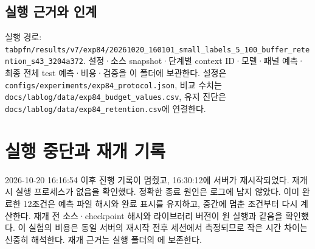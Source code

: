 \subsection{실행 근거와 인계}
실행 경로: \texttt{tabpfn/\allowbreak{}\allowbreak{}r\allowbreak{}esults/\allowbreak{}\allowbreak{}v\allowbreak{}7/\allowbreak{}\allowbreak{}exp84/\allowbreak{}\allowbreak{}20261020\allowbreak{}\_\allowbreak{}\allowbreak{}160101\_\allowbreak{}\allowbreak{}small\_\allowbreak{}\allowbreak{}la\allowbreak{}bels\_\allowbreak{}\allowbreak{}5\_\allowbreak{}\allowbreak{}1\allowbreak{}00\_\allowbreak{}\allowbreak{}buffe\allowbreak{}r\_\allowbreak{}\allowbreak{}retent\allowbreak{}ion\_\allowbreak{}\allowbreak{}s43\_\allowbreak{}\allowbreak{}3204a372\allowbreak{}}. 설정·소스 snapshot·단계별 context ID·모델·패널 예측·최종 전체 test 예측·비용·검증을 이 폴더에 보관한다. 설정은 \texttt{configs/\allowbreak{}\allowbreak{}experime\allowbreak{}nts/\allowbreak{}\allowbreak{}exp8\allowbreak{}4\_\allowbreak{}\allowbreak{}protoc\allowbreak{}ol.\allowbreak{}json}, 비교 수치는 \texttt{docs/\allowbreak{}\allowbreak{}lab\allowbreak{}log/\allowbreak{}\allowbreak{}data\allowbreak{}/\allowbreak{}\allowbreak{}exp84\_\allowbreak{}\allowbreak{}b\allowbreak{}udget\_\allowbreak{}\allowbreak{}va\allowbreak{}lues.\allowbreak{}csv\allowbreak{}}, 유지 진단은 \texttt{docs/\allowbreak{}\allowbreak{}lab\allowbreak{}log/\allowbreak{}\allowbreak{}data\allowbreak{}/\allowbreak{}\allowbreak{}exp84\_\allowbreak{}\allowbreak{}r\allowbreak{}etention\allowbreak{}.\allowbreak{}csv}에 연결한다.


\section{실행 중단과 재개 기록}
2026-10-20 16:16:54 이후 진행 기록이 멈췄고, 16:30:12에 서버가 재시작되었다. 재개 시 실행 프로세스가 없음을 확인했다. 정확한 종료 원인은 로그에 남지 않았다. 이미 완료한 12조건은 예측 파일 해시와 완료 표시를 유지하고, 중간에 멈춘 조건부터 다시 계산한다. 재개 전 소스·checkpoint 해시와 라이브러리 버전이 원 실행과 같음을 확인했다. 이 실험의 비용은 동일 서버의 재시작 전후 세션에서 측정되므로 작은 시간 차이는 신중히 해석한다. 재개 근거는 실행 폴더의 에 보존한다.

